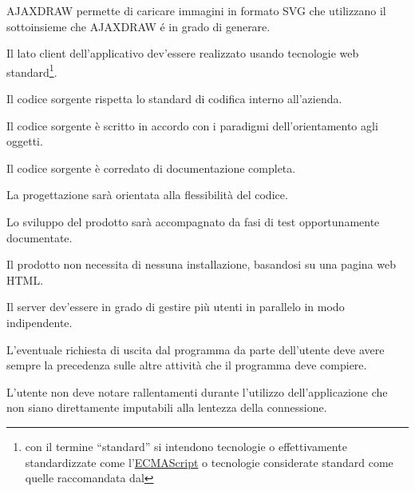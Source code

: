 \begin{elenconumerato}{\subsubsecindent}
\item{AJAXDRAW permette di caricare immagini in formato SVG che utilizzano il sottoinsieme che AJAXDRAW \'e in grado di generare.}
\end{elenconumerato}

\begin{elenconumerato}{\subsubsecindent}
\item Il lato client dell'applicativo dev'essere realizzato usando tecnologie web standard\footnote{con il termine ``standard'' si intendono tecnologie o effettivamente standardizzate come l'\underline{ECMAScript} o tecnologie considerate standard  come quelle raccomandata dal }.
\item Il codice sorgente rispetta lo standard di codifica interno all'azienda.
\item Il codice sorgente \`e scritto in accordo con i paradigmi dell'orientamento agli oggetti.
\item Il codice sorgente \`e corredato di documentazione completa.
\item La progettazione sar\`a orientata alla flessibilit\`a del codice.
\item Lo sviluppo del prodotto sar\`a accompagnato da fasi di test opportunamente documentate.
\item Il prodotto non necessita di nessuna installazione, basandosi su una pagina web HTML.
\item Il server dev'essere in grado di gestire pi\`u utenti in parallelo in modo indipendente.
\item L'eventuale richiesta di uscita dal programma da parte dell'utente deve avere sempre la precedenza sulle altre attivit\`a che il programma deve compiere.
\item L'utente non deve notare rallentamenti durante l'utilizzo dell'applicazione che non siano direttamente imputabili alla lentezza della connessione.
\end{elenconumerato}

\begin{elenconumerato}{\subsubsecindent}
\end{elenconumerato}

